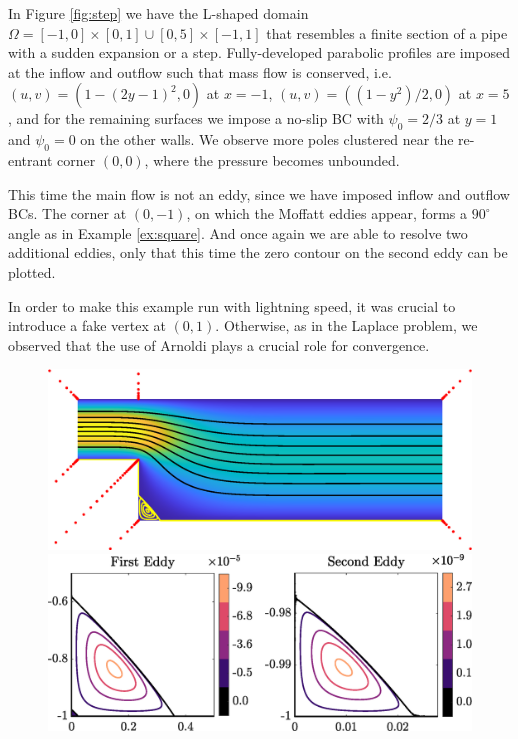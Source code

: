 \documentclass{article}
\begin{document}
\begin{example}
\label{ex:step}
In Figure \ref{fig:step} we have the L-shaped domain $\Omega = [-1,0] \times
[0,1] \cup [0,5]\times[-1,1]$ that resembles a finite section of a pipe with
a sudden expansion or a step. Fully-developed parabolic profiles are imposed
at the inflow and outflow such that mass flow is conserved, i.e.
$(u,v)=(1-(2y-1)^2,0)$ at $x=-1$, $(u,v)=((1-y^2)/2,0)$ at $x=5$, and for
the remaining surfaces we impose a no-slip BC with $\psi_0=2/3$ at $y=1$ and
$\psi_0=0$ on the other walls. We observe more poles clustered near the
re-entrant corner $(0,0)$, where the pressure becomes unbounded. 

This time the main flow is not an eddy, since we have imposed inflow and
outflow BCs. The corner at $(0,-1)$, on which the Moffatt eddies appear,
forms a $90^\circ$ angle as in Example \ref{ex:square}. And once again we
are able to resolve two additional eddies, only that this time the zero
contour on the second eddy can be plotted.

In order to make this example run with lightning speed, it was crucial to
introduce a fake vertex at $(0,1)$. Otherwise, as in the Laplace problem, we
observed that the use of Arnoldi plays a crucial role for convergence.
\begin{figure}[H]
	\centering
	\includegraphics[width=\linewidth]{Figures/step}
	
	\vspace{2em}
	\includegraphics[width=\linewidth]{Figures/step_eddy}
	

\end{figure}
\end{example}
\end{document}
